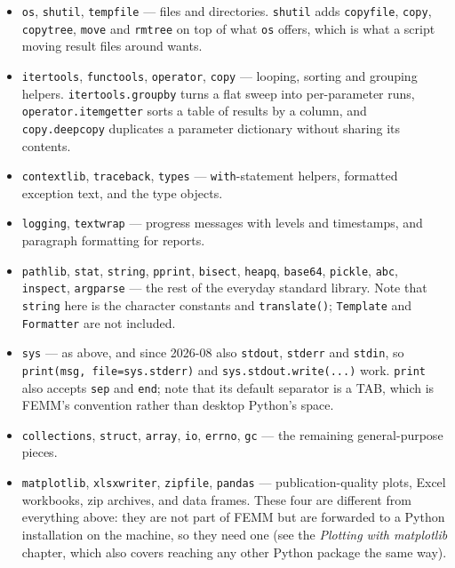 \begin{itemize}
\noindent
{\tt *}, {\tt ?} and {\tt [abc]} work in any part of the path, and
\verb+glob.glob("**/*.fem", recursive=True)+ walks subfolders too.  Results
come back unsorted, as in desktop Python --- sort them if the order matters.
\item{\tt os}, {\tt shutil}, {\tt tempfile} --- files and directories.
{\tt shutil} adds {\tt copyfile}, {\tt copy}, {\tt copytree}, {\tt move} and
{\tt rmtree} on top of what {\tt os} offers, which is what a script moving
result files around wants.
\item{\tt itertools}, {\tt functools}, {\tt operator}, {\tt copy} --- looping,
sorting and grouping helpers.  {\tt itertools.groupby} turns a flat sweep into
per-parameter runs, {\tt operator.itemgetter} sorts a table of results by a
column, and {\tt copy.deepcopy} duplicates a parameter dictionary without
sharing its contents.
\item{\tt contextlib}, {\tt traceback}, {\tt types} --- {\tt with}-statement
helpers, formatted exception text, and the type objects.
\item{\tt logging}, {\tt textwrap} --- progress messages with levels and
timestamps, and paragraph formatting for reports.
\item{\tt pathlib}, {\tt stat}, {\tt string}, {\tt pprint}, {\tt bisect},
{\tt heapq}, {\tt base64}, {\tt pickle}, {\tt abc}, {\tt inspect},
{\tt argparse} --- the rest of the everyday standard library.  Note that
{\tt string} here is the character constants and {\tt translate()};
{\tt Template} and {\tt Formatter} are not included.
\item{\tt sys} --- as above, and since 2026-08 also {\tt stdout},
{\tt stderr} and {\tt stdin}, so \verb+print(msg, file=sys.stderr)+ and
\verb+sys.stdout.write(...)+ work.  {\tt print} also accepts {\tt sep} and
{\tt end}; note that its default separator is a TAB, which is FEMM's
convention rather than desktop Python's space.
\item{\tt collections}, {\tt struct}, {\tt array}, {\tt io}, {\tt errno},
{\tt gc} --- the remaining general-purpose pieces.
\item{\tt matplotlib}, {\tt xlsxwriter}, {\tt zipfile}, {\tt pandas} ---
publication-quality plots, Excel workbooks, zip archives, and data frames.
These four are different from everything above: they are not
part of FEMM but are forwarded to a Python installation on the machine, so
they need one (see the {\em Plotting with matplotlib} chapter, which also
covers reaching any other Python package the same way).
\end{itemize}

